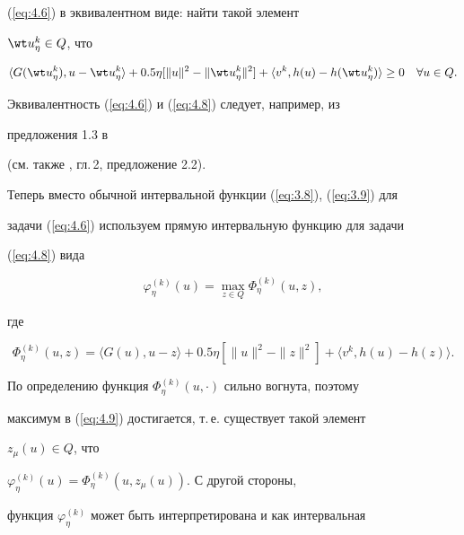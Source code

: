 (\ref{eq:4.6}) в эквивалентном виде: найти такой элемент


$\wt u^{k}_{\eta} \in Q$, что 


\begin{equation} \label{eq:4.8} 


\langle G (\wt u^{k}_{\eta}), u - \wt u^{k}_{\eta} \rangle 


+0.5 \eta [\|u\|^2 - \| \wt u^{k}_{\eta} \|^2] 


+\langle v^{k} , h(u) - h(\wt u^{k}_{\eta}) \rangle \geq 0


\quad \forall u \in Q.


\end{equation} 


Эквивалентность (\ref{eq:4.6}) и (\ref{eq:4.8}) следует, например, из 


предложения 1.3 в \cite{Pat99}


(см. также \cite{ET79}, гл.\,2, предложение 2.2).


Теперь вместо обычной интервальной функции (\ref{eq:3.8}), (\ref{eq:3.9}) для 


задачи (\ref{eq:4.6}) используем прямую интервальную функцию для задачи


(\ref{eq:4.8}) вида


\begin{equation} \label{eq:4.9} 


\varphi^{(k)}_{\eta} (u)=\max_{z \in Q} \Phi^{(k)}_{\eta} (u,z), 


\end{equation}


где 


\begin{equation} \label{eq:4.10} 


\Phi^{(k)}_{\eta} (u,z)=\langle G (u), u - z \rangle 


+0.5 \eta [\|u\|^2 - \| z \|^2]+\langle v^{k} , h(u) - h(z) \rangle. 


\end{equation}


По определению функция $\Phi^{(k)}_{\eta}(u,\cdot)$ сильно вогнута, поэтому 


максимум в (\ref{eq:4.9}) достигается, т.\,е. существует такой элемент


$z_{\mu} (u) \in Q$, что


$ \varphi^{(k)}_{\eta}(u)=\Phi^{(k)}_{\eta}(u,z_{\mu}(u))$. С другой стороны, 


функция $ \varphi^{(k)}_{\eta}$ может быть интерпретирована и как интервальная 



